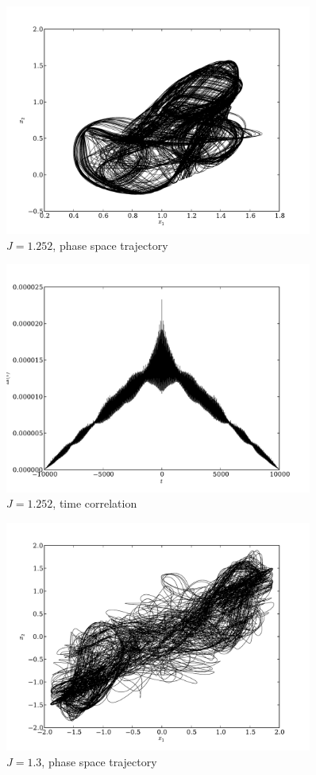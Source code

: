 \documentclass{article} %
\begin{document}
\begin{figure}[p]
	\centering
	\includegraphics[width=0.9\textwidth]{paul_figs/J_1_252}
	\caption{$J=1.252$, phase space trajectory}
\end{figure}
\begin{figure}[p]
	\centering
	\includegraphics[width=0.9\textwidth]{paul_figs/tcorr_J_1_252}
	\caption{$J=1.252$, time correlation}
\end{figure}
\begin{figure}[p]
	\centering
	\includegraphics[width=0.9\textwidth]{paul_figs/J_1_3}
	\caption{$J=1.3$, phase space trajectory}
\end{figure}
\end{document}
